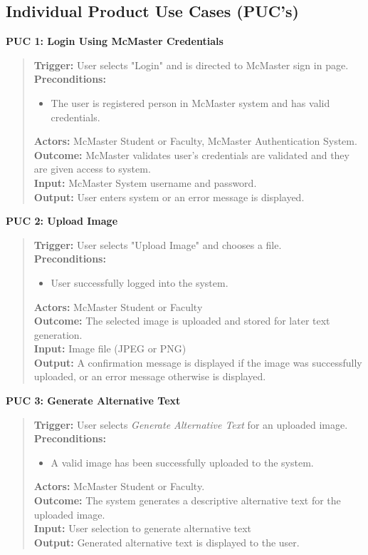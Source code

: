 \documentclass[12pt]{article}
\begin{document}
\subsection{Individual Product Use Cases (PUC's)}
\textbf{PUC 1: Login Using McMaster Credentials }
\begin{quote}
  \textbf{Trigger:} User selects "Login" and is directed to McMaster
  sign in page.\\
  \textbf{Preconditions:}
  \begin{itemize}
    \item The user is registered person in McMaster system and has
      valid credentials.
  \end{itemize}
  \textbf{Actors:} McMaster Student or Faculty, McMaster
  Authentication System.\\
  \textbf{Outcome:} McMaster validates user's credentials are
  validated and they are given access to system.\\
  \textbf{Input:} McMaster System username and password. \\
  \textbf{Output:} User enters system or an error message is displayed.
\end{quote}
\textbf{PUC 2: Upload Image }
\begin{quote}
\textbf{Trigger:} User selects "Upload Image" and chooses a file.\\
\textbf{Preconditions:}
\begin{itemize}
  \item User successfully logged into the system.
\end{itemize}
\textbf{Actors:} McMaster Student or Faculty \\
\textbf{Outcome:} The selected image is uploaded and stored for later text generation.\\
\textbf{Input:} Image file (JPEG or PNG) \\
\textbf{Output:} A confirmation message is displayed if the image was successfully uploaded, or an error message otherwise is displayed.
\end{quote}
\textbf{PUC 3: Generate Alternative Text}
\begin{quote}
  \textbf{Trigger:} User selects \textit{Generate Alternative Text}
  for an uploaded image.\\
  \textbf{Preconditions:}
  \begin{itemize}
    \item A valid image has been successfully uploaded to the system.
  \end{itemize}
  \textbf{Actors:} McMaster Student or Faculty.\\
  \textbf{Outcome:} The system generates a descriptive alternative
  text for the uploaded image.\\
  \textbf{Input:} User selection to generate alternative text\\
  \textbf{Output:} Generated alternative text is displayed to the user.
\end{quote}
\end{document}
